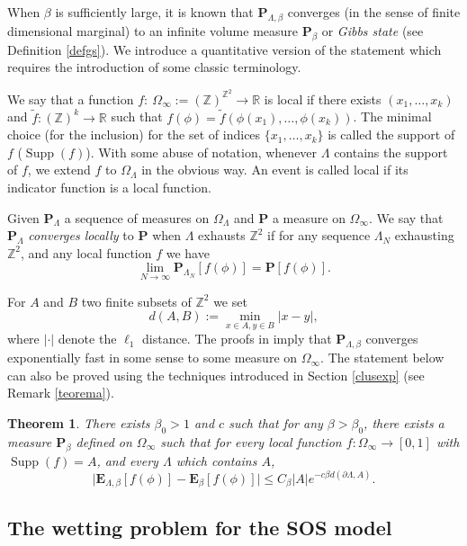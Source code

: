 \documentclass[JEP,XML,SOM,Unicode, NoFloatCountersInSection]{cedram}
\numberwithin{equation}{section}
\theoremstyle{plain}
\newtheorem{theorema}{Theorem}
\theoremstyle{definition}
\DeclareMathOperator{\Supp}{Supp}
\newcommand{\bP}{{\ensuremath{\mathbf P}} }
\newcommand{\bE}{{\ensuremath{\mathbf E}} }
\newcommand{\bbR}{{\ensuremath{\mathbb R}} }
\newcommand{\bbZ}{{\ensuremath{\mathbb Z}} }
\newcommand{\gb}{\beta}
\newcommand{\gO}{\Omega}
\newcommand{\gL}{\Lambda}
\begin{document}
When $\gb$ is sufficiently large, it is known \cite[Th.\,2]{cf:BM} that $\bP_{\gL,\gb}$ converges (in the sense of finite dimensional marginal)
to an infinite volume measure $\bP_{\gb}$ or \textit{Gibbs state} (see Definition \ref{defgs}). We introduce a quantitative version of the statement which requires
the introduction of some classic terminology.

We say that a function $f: \ \gO_{\infty}:=(\bbZ)^{\bbZ^2}\to \bbR$ is local if there exists $(x_1,\dots,x_k)$ and $\tilde f: (\bbZ)^{k}\to \bbR$
such that $f(\phi)=\tilde f(\phi(x_1),\dots,\phi(x_k))$. The minimal choice (for the inclusion)
for the set of indices $\{x_1,\dots, x_k\}$ is called the support of $f$ ($\Supp(f)$).
With some abuse of notation, whenever $\gL$ contains the support of $f$, we extend $f$ to $\gO_{\gL}$ in the obvious way.
An event is called local if its indicator function is a local function.

Given $\bP_{\gL}$ a sequence of measures on $\gO_{\gL}$ and $\bP$ a measure on $\gO_{\infty}$.
We say that~$\bP_{\gL}$ \textit{converges locally} to $\bP$ when $\gL$ exhausts $\bbZ^2$ if for any sequence $\gL_N$ exhausting $\bbZ^2$,
and any local function $f$ we have
\[
\lim_{N\to \infty} \bP_{\gL_N}[f(\phi)]=\bP[f(\phi)].
\]

For $A$ and $B$ two finite subsets of $\bbZ^2$ we set
\begin{equation*}%
d(A,B):=\min_{x\in A, y\in B} |x-y|,
\end{equation*}
where $|\cdot|$ denote the $\ell_1$ distance. The proofs in \cite{cf:BM} imply that $\bP_{\gL,\gb}$
converges exponentially fast in some sense to some measure on $\gO_{\infty}$. The statement below can also be proved using the
techniques introduced in Section \ref{clusexp} (see Remark \ref{teorema}).

\begin{theorema}\label{infinitevol}
There exists $\gb_0>1$ and $c$ such that
for any $\gb>\gb_0$,
there exists a measure $\bP_{\gb}$ defined on $\gO_{\infty}$ such that for every local function
$f: \gO_{\infty}\to [0,1]$ with $\Supp(f)=A$, and every $\gL$ which contains $A$,
\begin{equation*}%
\bigl| \bE_{\gL,\gb}[f(\phi)]-\bE_{\gb}[f(\phi)] \bigr|\le C_{\gb} |A| e^{-c \gb d(\partial \gL, A)}.
\end{equation*}
\end{theorema}

\subsection{The wetting problem for the SOS model}
\end{document}
